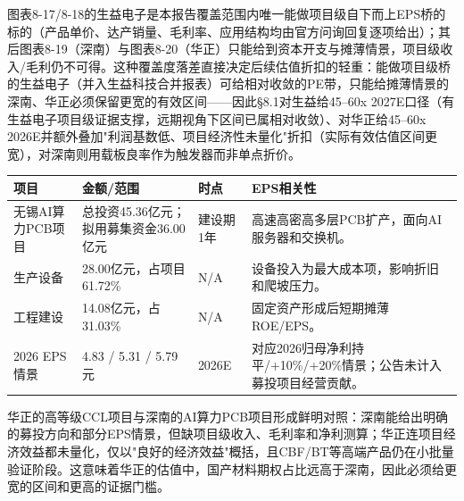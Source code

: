 图表8-17/8-18的生益电子是本报告覆盖范围内唯一能做项目级自下而上EPS桥的标的（产品单价、达产销量、毛利率、应用结构均由官方问询回复逐项给出）；其后图表8-19（深南）与图表8-20（华正）只能给到资本开支与摊薄情景，项目级收入/毛利仍不可得。这种覆盖度落差直接决定后续估值折扣的轻重：能做项目级桥的生益电子（并入生益科技合并报表）可给相对收敛的PE带，只能给摊薄情景的深南、华正必须保留更宽的有效区间——因此§8.1对生益给45--60x 2027E口径（有生益电子项目级证据支撑，远期视角下区间已属相对收敛）、对华正给45--60x 2026E并额外叠加"利润基数低、项目经济性未量化"折扣（实际有效估值区间更宽），对深南则用载板良率作为触发器而非单点折价。

\begin{exhibitbox}[图表8-19：深南AI算力PCB项目资本开支与摊薄桥]
\footnotesize
\begin{tabularx}{\textwidth}{L{2.5cm}R{1.8cm}R{1.8cm}X}
\toprule
\textbf{项目} & \textbf{金额/范围} & \textbf{时点} & \textbf{EPS相关性} \\
\midrule
无锡AI算力PCB项目 & 总投资45.36亿元；拟用募集资金36.00亿元 & 建设期1年 & 高速高密高多层PCB扩产，面向AI服务器和交换机。 \\
生产设备 & 28.00亿元，占项目61.72\% & N/A & 设备投入为最大成本项，影响折旧和爬坡压力。 \\
工程建设 & 14.08亿元，占31.03\% & N/A & 固定资产形成后短期摊薄ROE/EPS。 \\
2026 EPS情景 & 4.83 / 5.31 / 5.79元 & 2026E & 对应2026归母净利持平/+10\%/+20\%情景；公告未计入募投项目经营贡献。 \\
\bottomrule
\end{tabularx}
\end{exhibitbox}

华正的高等级CCL项目与深南的AI算力PCB项目形成鲜明对照：深南能给出明确的募投方向和部分EPS情景，但缺项目级收入、毛利率和净利测算；华正连项目经济效益都未量化，仅以"良好的经济效益"概括，且CBF/BT等高端产品仍在小批量验证阶段。这意味着华正的估值中，国产材料期权占比远高于深南，因此必须给更宽的区间和更高的证据门槛。

